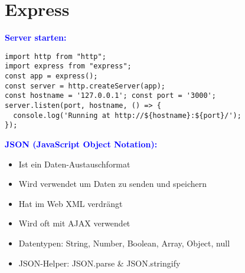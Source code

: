 
\section{Express}
\textbf{\textcolor{blue}{Server starten:}}
\begin{lstlisting}[style=htmlcssjs]
import http from "http";
import express from "express";
const app = express();
const server = http.createServer(app);
const hostname = '127.0.0.1'; const port = '3000';
server.listen(port, hostname, () => {
  console.log('Running at http://${hostname}:${port}/');
});
\end{lstlisting}
\textbf{\textcolor{blue}{JSON (JavaScript Object Notation):}}
\begin{itemize}[topsep=0pt, leftmargin=3mm]
    \setlength\itemsep{-0.3em}
    \item Ist ein Daten-Austauschformat
    \item Wird verwendet um Daten zu senden und speichern
    \item Hat im Web XML verdrängt
    \item Wird oft mit AJAX verwendet
    \item Datentypen: String, Number, Boolean, Array, Object, null
    \item JSON-Helper: JSON.parse \& JSON.stringify
\end{itemize}
